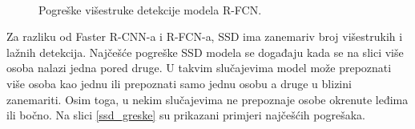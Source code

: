 \begin{figure}[H]
 \
\caption{Pogreške višestruke detekcije modela R-FCN.}
\label{rfcn_greske}
\end{figure}

Za razliku od Faster R-CNN-a i R-FCN-a, SSD ima zanemariv broj višestrukih i lažnih detekcija. Najčešće pogreške SSD modela se događaju kada se na slici više osoba nalazi jedna pored druge. U takvim slučajevima model može prepoznati više osoba kao jednu ili prepoznati samo jednu osobu a druge u blizini zanemariti. Osim toga, u nekim slučajevima ne prepoznaje osobe okrenute leđima ili bočno. Na slici \ref{ssd_greske} su prikazani primjeri najčešćih pogrešaka.

